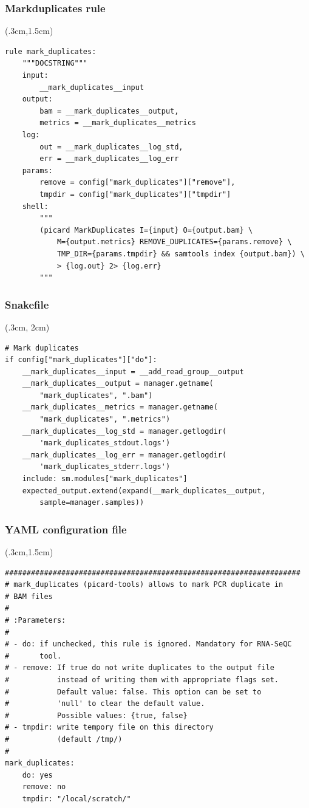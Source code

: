 \documentclass{beamer}
\begin{document}
\begin{frame}[fragile]
  \frametitle{Markduplicates rule}
    \begin{textblock*}{15cm}(.3cm,1.5cm)
    \begin{lstlisting}
rule mark_duplicates:
    """DOCSTRING"""
    input:
        __mark_duplicates__input
    output:
        bam = __mark_duplicates__output,
        metrics = __mark_duplicates__metrics
    log:
        out = __mark_duplicates__log_std,
        err = __mark_duplicates__log_err
    params:
        remove = config["mark_duplicates"]["remove"],
        tmpdir = config["mark_duplicates"]["tmpdir"]
    shell:
        """
        (picard MarkDuplicates I={input} O={output.bam} \
            M={output.metrics} REMOVE_DUPLICATES={params.remove} \
            TMP_DIR={params.tmpdir} && samtools index {output.bam}) \
            > {log.out} 2> {log.err}
        """
  \end{lstlisting}
  \end{textblock*}
\end{frame}

\begin{frame}[fragile]
  \frametitle{Snakefile}
  \begin{textblock*}{15cm}(.3cm, 2cm)
  \begin{lstlisting}
# Mark duplicates
if config["mark_duplicates"]["do"]:
    __mark_duplicates__input = __add_read_group__output
    __mark_duplicates__output = manager.getname(
        "mark_duplicates", ".bam")
    __mark_duplicates__metrics = manager.getname(
        "mark_duplicates", ".metrics")
    __mark_duplicates__log_std = manager.getlogdir(
        'mark_duplicates_stdout.logs')
    __mark_duplicates__log_err = manager.getlogdir(
        'mark_duplicates_stderr.logs')
    include: sm.modules["mark_duplicates"]
    expected_output.extend(expand(__mark_duplicates__output,
        sample=manager.samples))
  \end{lstlisting}
  \end{textblock*}
\end{frame}

\begin{frame}[fragile]
  \frametitle{YAML configuration file}
  \begin{textblock*}{15cm}(.3cm,1.5cm)
  \begin{lstlisting}
####################################################################
# mark_duplicates (picard-tools) allows to mark PCR duplicate in 
# BAM files
#
# :Parameters:
#
# - do: if unchecked, this rule is ignored. Mandatory for RNA-SeQC
#       tool.
# - remove: If true do not write duplicates to the output file
#           instead of writing them with appropriate flags set.
#           Default value: false. This option can be set to
#           'null' to clear the default value.
#           Possible values: {true, false}
# - tmpdir: write tempory file on this directory
#           (default /tmp/)
#
mark_duplicates:
    do: yes
    remove: no
    tmpdir: "/local/scratch/"
  \end{lstlisting}
  \end{textblock*}
\end{frame}
\end{document}
